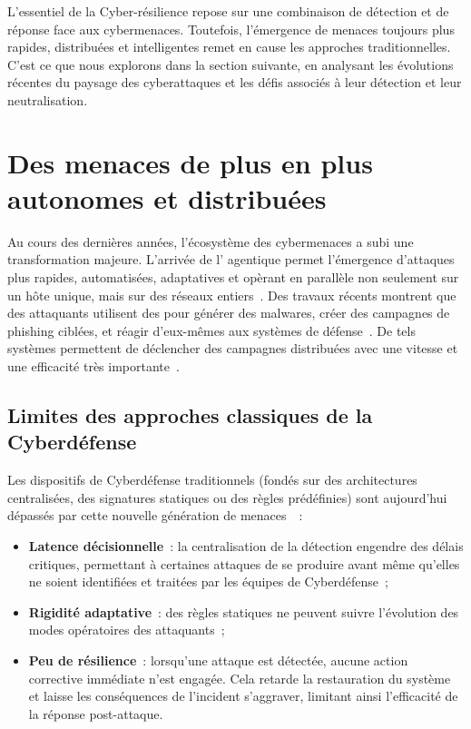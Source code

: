 \noindent
L'essentiel de la Cyber-résilience repose sur une combinaison de détection  et de réponse face aux cybermenaces. Toutefois, l'émergence de menaces toujours plus rapides, distribuées et intelligentes remet en cause les approches traditionnelles. C'est ce que nous explorons dans la section suivante, en analysant les évolutions récentes du paysage des cyberattaques et les défis associés à leur détection et leur neutralisation.


\section{Des menaces de plus en plus autonomes et distribuées}\label{sec:evolution-menaces}

Au cours des dernières années, l'écosystème des cybermenaces a subi une transformation majeure. L'arrivée de l' agentique permet l'émergence d'attaques plus rapides, automatisées, adaptatives et opèrant en parallèle non seulement sur un hôte unique, mais sur des réseaux entiers~\cite{Cohen2020}. Des travaux récents montrent que des attaquants utilisent des  pour générer des malwares, créer des campagnes de phishing ciblées, et réagir d'eux-mêmes aux systèmes de défense~\cite{AutoAttacker2024}. De tels systèmes permettent de déclencher des campagnes distribuées avec une vitesse et une efficacité très importante~\cite{AgenticAIThreats2025}.

\subsection*{Limites des approches classiques de la Cyberdéfense}

Les dispositifs de Cyberdéfense traditionnels (fondés sur des architectures centralisées, des signatures statiques ou des règles prédéfinies) sont aujourd'hui dépassés par cette nouvelle génération de menaces~\cite{Kott2023}~:
\begin{itemize}
  \item \textbf{Latence décisionnelle}~: la centralisation de la détection engendre des délais critiques, permettant à certaines attaques de se produire avant même qu’elles ne soient identifiées et traitées par les équipes de Cyberdéfense~;
  \item \textbf{Rigidité adaptative}~: des règles statiques ne peuvent suivre l'évolution des modes opératoires des attaquants~;
  \item \textbf{Peu de résilience}~: lorsqu'une attaque est détectée, aucune action corrective immédiate n'est engagée. Cela retarde la restauration du système et laisse les conséquences de l'incident s'aggraver, limitant ainsi l'efficacité de la réponse post-attaque.
\end{itemize}

